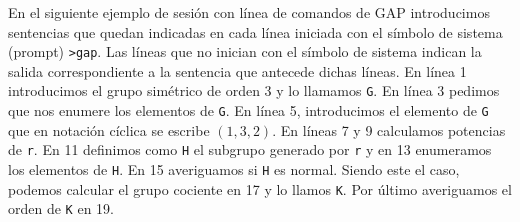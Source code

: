 \begin{subappendices}
\begin{ejemplo}{} En el siguiente ejemplo de sesión con línea de comandos de GAP introducimos sentencias que quedan indicadas en cada línea iniciada con el símbolo de sistema (prompt) \verb~>gap~. Las líneas que no inician con el símbolo de sistema indican la salida correspondiente a la sentencia que antecede dichas líneas. En línea 1 introducimos el grupo simétrico de orden 3 y lo llamamos \texttt{G}. En línea 3 pedimos que nos enumere los elementos de \texttt{G}. En línea 5, introducimos el elemento de \texttt{G} que en notación cíclica se escribe $(1,3,2)$. En líneas 7 y 9 calculamos potencias de \texttt{r}. En 11 definimos como \texttt{H} el subgrupo generado por
\texttt{r} y en 13 enumeramos los elementos de \texttt{H}. En 15 averiguamos si \texttt{H} es normal. Siendo este el caso, podemos calcular el grupo cociente en 17 y lo llamos \texttt{K}. Por último averiguamos el orden de \texttt{K} en 19.


\end{ejemplo}




\end{subappendices}
%   
%   


%

